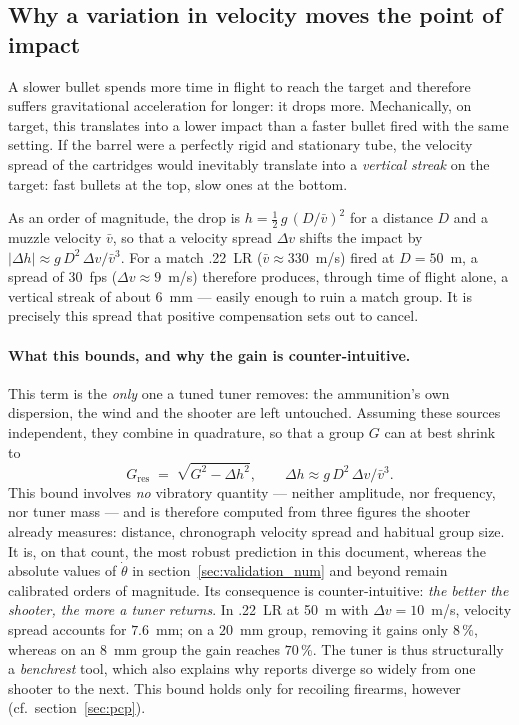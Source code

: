 \documentclass[12pt,a4paper]{article}
\begin{document}
	\subsection{Why a variation in velocity moves the point of impact}

	A slower bullet spends more time in flight to reach the target and therefore suffers gravitational acceleration for longer: it drops more. Mechanically, on target, this translates into a lower impact than a faster bullet fired with the same setting. If the barrel were a perfectly rigid and stationary tube, the velocity spread of the cartridges would inevitably translate into a \emph{vertical streak} on the target: fast bullets at the top, slow ones at the bottom.

	As an order of magnitude, the drop is $h = \tfrac12\,g\,(D/\bar v)^2$ for a distance $D$ and a muzzle velocity $\bar v$, so that a velocity spread $\Delta v$ shifts the impact by $|\Delta h| \approx g\,D^2\,\Delta v / \bar v^3$. For a match .22~LR ($\bar v \approx 330$~m/s) fired at $D = 50$~m, a spread of $30$~fps ($\Delta v \approx 9$~m/s) therefore produces, through time of flight alone, a vertical streak of about $6$~mm --- easily enough to ruin a match group. It is precisely this spread that positive compensation sets out to cancel.

	\paragraph{What this bounds, and why the gain is counter-intuitive.} This term is the \emph{only} one a tuned tuner removes: the ammunition's own dispersion, the wind and the shooter are left untouched. Assuming these sources independent, they combine in quadrature, so that a group $G$ can at best shrink to
	\begin{equation}
		G_\text{res} \;=\; \sqrt{G^2 - \Delta h^2}, \qquad \Delta h \approx g\,D^2\,\Delta v / \bar v^3.
		\label{eq:gres}
	\end{equation}
	This bound involves \emph{no} vibratory quantity --- neither amplitude, nor frequency, nor tuner mass --- and is therefore computed from three figures the shooter already measures: distance, chronograph velocity spread and habitual group size. It is, on that count, the most robust prediction in this document, whereas the absolute values of $\dot\theta$ in section~\ref{sec:validation_num} and beyond remain calibrated orders of magnitude. Its consequence is counter-intuitive: \emph{the better the shooter, the more a tuner returns}. In .22~LR at 50~m with $\Delta v = 10$~m/s, velocity spread accounts for $7.6$~mm; on a $20$~mm group, removing it gains only $8\,\%$, whereas on an $8$~mm group the gain reaches $70\,\%$. The tuner is thus structurally a \emph{benchrest} tool, which also explains why reports diverge so widely from one shooter to the next. This bound holds only for recoiling firearms, however (cf.\ section~\ref{sec:pcp}).
\end{document}
